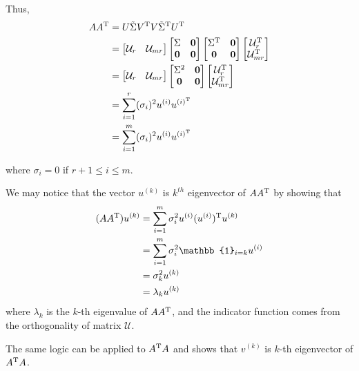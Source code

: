 Thus,
\begin{align*}
AA^{{\rm T}} &= U\tilde{\Sigma} V^{{\rm T}}V\tilde{\Sigma}^{{\rm T}}U^{{\rm T}}\\
&=
\begin{bmatrix}
\mathcal{U}_r & \mathcal{U}_{mr}
\end{bmatrix}
\begin{bmatrix}
\Sigma & \textbf{0}\\
\textbf{0}&\textbf{0}
\end{bmatrix}
\begin{bmatrix}
\Sigma^{{\rm T}} & \textbf{0}\\
\textbf{0}&\textbf{0}
\end{bmatrix}
\begin{bmatrix}
\mathcal{U}_r^{{\rm T}}\\
\mathcal{U}_{mr}^{{\rm T}}
\end{bmatrix}\\
&
=\begin{bmatrix}
\mathcal{U}_r & \mathcal{U}_{mr}
\end{bmatrix}
\begin{bmatrix}
\Sigma^2 & \textbf{0}\\
\textbf{0}&\textbf{0}
\end{bmatrix}
\begin{bmatrix}
\mathcal{U}_r^{{\rm T}}\\
\mathcal{U}_{mr}^{{\rm T}}
\end{bmatrix}\\
&= \sum^r_{i=1}(\sigma_i)^2u^{(i)}u^{(i)^{{\rm T}}}\\
&= \sum^m_{i=1}(\sigma_i)^2u^{(i)}u^{(i)^{{\rm T}}}
\end{align*}

where $\sigma_i = 0$ if $r+1\leq i\leq m$.

We may notice that the vector $u^{(k)}$ is $k^{th}$ eigenvector of $AA^{{\rm T}}$ by showing that
\begin{align*}
(AA^{\trans})u^{(k)} 
& = \sum^m_{i=1}\sigma_i^2u^{(i)}(u^{(i)})^{\trans}u^{(k)}\\
& = \sum^m_{i=1}\sigma_i^2 \mathbb{1}_{i=k} u^{(i)} \\
& = \sigma^2_ku^{(k)}\\
& = \lambda_k u^{(k)}
\end{align*}
where $\lambda_k$ is the $k$-th eigenvalue of $AA^{{\rm T}}$, and the indicator function comes from the orthogonality of matrix $\mathcal{U}$.

The same logic can be applied to $A^{{\rm T}}A$ and shows that $v^{(k)}$ is $k$-th eigenvector of $A^{{\rm T}}A$.

